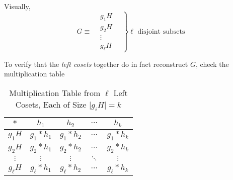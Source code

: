 \begin{remark}
    Visually,
    \begin{equation}
        G \equiv \left. \begin{matrix}
            &\boxed{{g_1} H} \\
            &\boxed{{g_2} H} \\
            &\vdots \\
            &\boxed{{g_\ell} H}
        \end{matrix} \quad \right\} \ell \text{ disjoint subsets}
    \end{equation}
    
    To verify that the \textit{left cosets} together do in fact reconstruct $G$, check the multiplication table
    \begin{table}[H]
    \centering
    \begin{tabular}{c | c c c c}
    \toprule
    $\ast$     & $h_1$             & $h_2$             & $\cdots$ & $h_k$ \\ 
    \midrule
    $g_1 H$    & $g_1 \ast h_1$    & $g_1 \ast h_2$    & $\cdots$ & $g_1 \ast h_k$ \\
    $g_2 H$    & $g_2 \ast h_1$    & $g_2 \ast h_2$    & $\cdots$ & $g_2 \ast h_k$ \\
    $\vdots$   & $\vdots$          & $\vdots$          & $\ddots$ & $\vdots$ \\
    $g_\ell H$ & $g_\ell \ast h_1$ & $g_\ell \ast h_2$ & $\cdots$ & $g_\ell \ast h_k$ \\ 
    \bottomrule
    \end{tabular}
    \caption{Multiplication Table from $\ell$ Left Cosets, Each of Size $\lvert g_i H \rvert = k$}
    \end{table}
\end{remark}